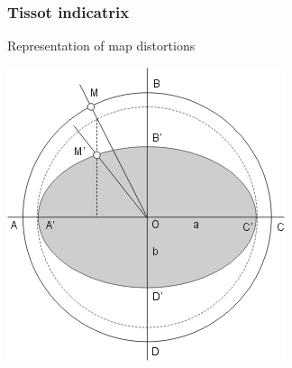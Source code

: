 \documentclass[17pt]{beamer}
\begin{document}
\begin{frame}
  \frametitle{Tissot indicatrix}
  \begin{block}{Representation of map distortions}
    \begin{center}
      \includegraphics[scale=0.5]{pycon-2011-tutorial-files/indicatrix.png}
    \end{center}
  \end{block}
\end{frame}
\end{document}
